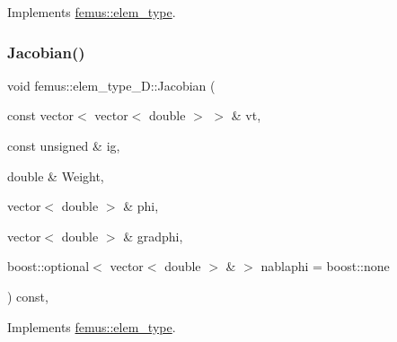 Implements \mbox{\hyperlink{classfemus_1_1elem__type_a937b1d5ecbeed3b17db831264a3492fa}{femus\+::elem\+\_\+type}}.

\mbox{\label{classfemus_1_1elem__type__1_d_aec9766e008c3f7536a4a68d87302b254}} 
\subsubsection{\texorpdfstring{Jacobian()}{Jacobian()}\hspace{0.1cm}{\footnotesize\ttfamily [2/4]}}
{\footnotesize\ttfamily void femus\+::elem\+\_\+type\+\_\+D\+::\+Jacobian (\begin{DoxyParamCaption}\item[{const vector$<$ vector$<$ double $>$ $>$ \&}]{vt,  }\item[{const unsigned \&}]{ig,  }\item[{double \&}]{Weight,  }\item[{vector$<$ double $>$ \&}]{phi,  }\item[{vector$<$ double $>$ \&}]{gradphi,  }\item[{boost\+::optional$<$ vector$<$ double $>$ \& $>$}]{nablaphi = {\ttfamily boost\+:\+:none} }\end{DoxyParamCaption}) const\hspace{0.3cm}{\ttfamily [inline]}, {\ttfamily [virtual]}}



Implements \mbox{\hyperlink{classfemus_1_1elem__type_ac3828ecd8ddd057d726a60cb19c60f0b}{femus\+::elem\+\_\+type}}.

\mbox{\label{classfemus_1_1elem__type__1_d_a6209ff2d3d1b74ac6f1ee1eb9140908e}} 
